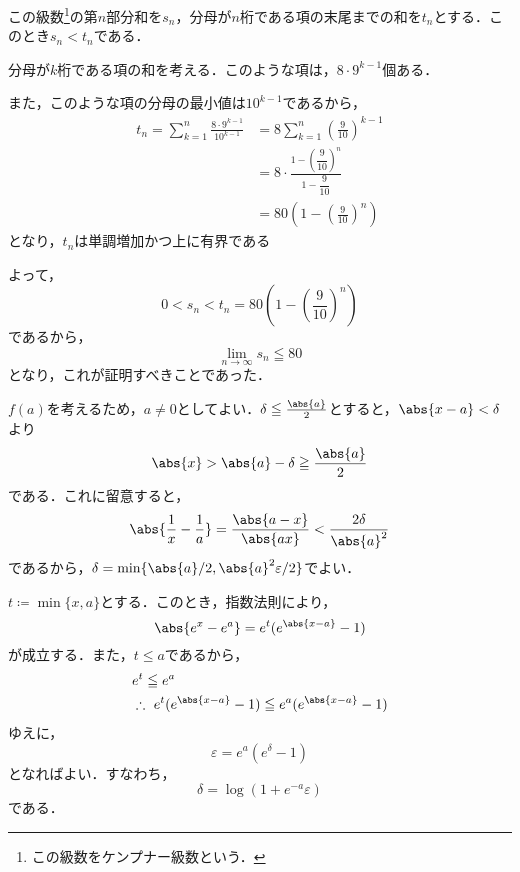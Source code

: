 
\begin{tproof}
    この級数\footnote{この級数をケンプナー級数という．}の第$n$部分和を$s_n$，分母が$n$桁である項の末尾までの和を$t_n$とする．このとき$s_n < t_n$である．

    分母が$k$桁である項の和を考える．このような項は，$8 \cdot 9^{k-1}$個ある．

    また，このような項の分母の最小値は$10^{k-1}$であるから，
    \begin{align*}
        t_n = \sum_{k=1}^{n} \frac{8 \cdot 9^{k-1}}{10^{k-1}} & = 8 \sum_{k=1}^{n} \left(\frac{9}{10}\right)^{k-1}               \\
                                                              & = 8 \cdot \frac{1-\left(\dfrac{9}{10}\right)^n}{1-\dfrac{9}{10}} \\
                                                              & = 80 \left(1-\left(\frac{9}{10}\right)^n\right)
    \end{align*}
    となり，$t_n$は単調増加かつ上に有界である

    よって，
    \[
        0 < s_n < t_n = 80 \left(1-\left(\frac{9}{10}\right)^n\right)
    \]
    であるから，
    \[
        \lim_{n \to \infty} s_n \leqq 80
    \]
    となり，これが証明すべきことであった．
\end{tproof}







\begin{tanswer}
    $f(a)$を考えるため，$a \ne 0$としてよい．$\delta \le \frac{\abs{a}}{2}$とすると，$\abs{x-a}<\delta$より
    \[
        \abs{x} > \abs{a}-\delta \ge \frac{\abs{a}}{2}
    \]
    である．これに留意すると，
    \[
        \abs{\frac{1}{x}-\frac{1}{a}}=\frac{\abs{a-x}}{\abs{ax}} <\frac{2 \delta}{\abs{a}^2}
    \]
    であるから，$\delta = \min \{ \abs{a}/2,\abs{a}^2\varepsilon/2 \}$でよい．
\end{tanswer}





\begin{tanswer}
    $t \coloneqq \min \{x,a\}$とする．このとき，指数法則により，
    \[
        \abs{e^x-e^a}=e^t (e^{\abs{x-a}}-1)
    \]
    が成立する．また，$t \le a$であるから，
    \begin{align*}
         & e^t \le e^a                                                \\
         & \therefore ~ e^t(e^{\abs{x-a}}-1) \le e^a(e^{\abs{x-a}}-1)
    \end{align*}
    ゆえに，
    \[
        \varepsilon = e^a (e^\delta -1)
    \]
    となればよい．すなわち，
    \[
        \delta = \log (1+e^{-a}\varepsilon)
    \]
    である．
\end{tanswer}


